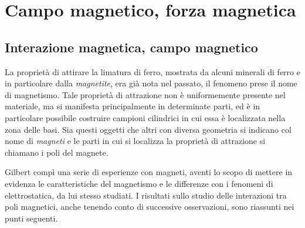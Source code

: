 \documentclass[class=book, crop=false, oneside, 12pt]{standalone}
\begin{document}
\chapter{Campo magnetico, forza magnetica}

\section{Interazione magnetica, campo magnetico}

La proprietà di attirare la limatura di ferro, mostrata da alcuni minerali di ferro e in particolare dalla \emph{magnetite}, era già nota nel passato, il fenomeno prese il nome di magnetismo.
Tale proprietà di attrazione non è uniformemente presente nel materiale, ma si manifesta principalmente in determinate parti, ed è in particolare possibile costruire campioni cilindrici in cui essa è localizzata nella zona delle basi. 
Sia questi oggetti che altri con diversa geometria si indicano col nome di \emph{magneti} e le parti in cui si localizza la proprietà di attrazione si chiamano i poli del magnete.

Gilbert compì una serie di esperienze con magneti, aventi lo scopo di mettere in evidenza le caratteristiche del magnetismo e le differenze con i fenomeni di elettrostatica, da lui stesso studiati. 
I risultati sullo studio delle interazioni tra poli magnetici, anche tenendo conto di successive osservazioni, sono riassunti nei punti seguenti.
\end{document}
